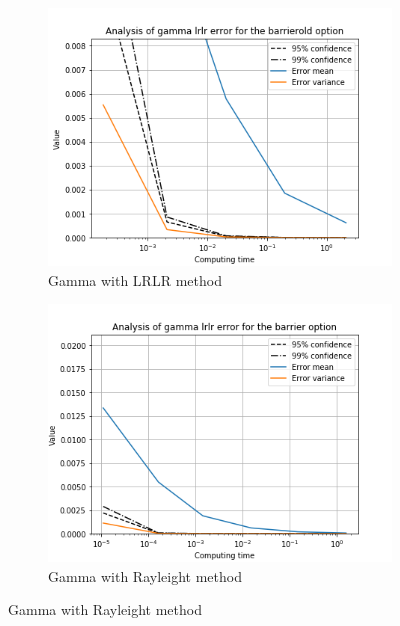 \documentclass[11pt,a4paper,fleqn,draft]{article}
\begin{document}
\begin{figure}[h!]
      \begin{subfigure}[b]{0.45\textwidth}
          \includegraphics[width=\textwidth]{graphs/barrieroldgammalrlrtime.png}
          \caption{Gamma with LRLR method}
      \end{subfigure}
      \begin{subfigure}[b]{0.45\textwidth}
          \includegraphics[width=\textwidth]{graphs/barriergammalrlrtime.png}
          \caption{Gamma with Rayleight method}
      \end{subfigure}


\end{figure}
\end{document}
